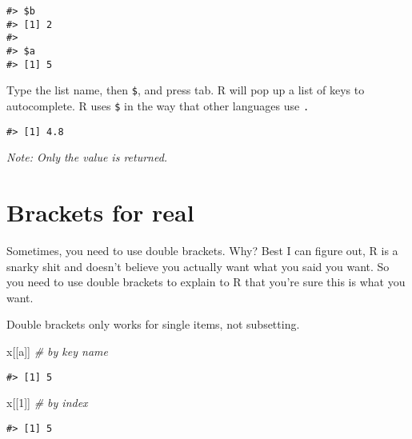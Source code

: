 \documentclass[
]{book}
\newenvironment{Shaded}{\begin{snugshade}}{\end{snugshade}}
\newcommand{\CommentTok}[1]{\textcolor[rgb]{0.56,0.35,0.01}{\textit{#1}}}
\newcommand{\DecValTok}[1]{\textcolor[rgb]{0.00,0.00,0.81}{#1}}
\newcommand{\NormalTok}[1]{#1}
\newcommand{\SpecialCharTok}[1]{\textcolor[rgb]{0.00,0.00,0.00}{#1}}
\newcommand{\StringTok}[1]{\textcolor[rgb]{0.31,0.60,0.02}{#1}}
\begin{document}
\begin{verbatim}
#> $b
#> [1] 2
#> 
#> $a
#> [1] 5
\end{verbatim}

Type the list name, then \texttt{\$}, and press tab. R will pop up a list of keys to autocomplete. R uses \texttt{\$} in the way that other languages use \texttt{.}

\begin{Shaded}
\end{Shaded}

\begin{verbatim}
#> [1] 4.8
\end{verbatim}

\emph{Note: Only the value is returned.}

\hypertarget{brackets-for-real}{%
\section{Brackets for real}\label{brackets-for-real}}

Sometimes, you need to use double brackets. Why? Best I can figure out, R is a snarky shit and doesn't believe you actually want what you said you want. So you need to use double brackets to explain to R that you're sure this is what you want.

Double brackets only works for single items, not subsetting.

\begin{Shaded}
\begin{Highlighting}[]
\NormalTok{x[[}\StringTok{\textquotesingle{}a\textquotesingle{}}\NormalTok{]] }\CommentTok{\# by key name}
\end{Highlighting}
\end{Shaded}

\begin{verbatim}
#> [1] 5
\end{verbatim}

\begin{Shaded}
\begin{Highlighting}[]
\NormalTok{x[[}\DecValTok{1}\NormalTok{]]   }\CommentTok{\# by index}
\end{Highlighting}
\end{Shaded}

\begin{verbatim}
#> [1] 5
\end{verbatim}
\end{document}
